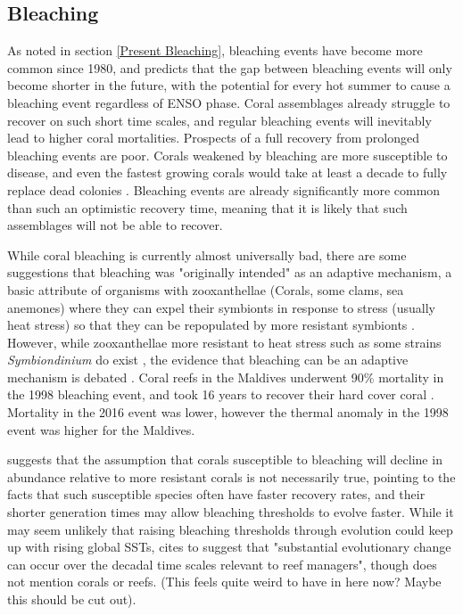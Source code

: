 \documentclass[11pt,a4paper]{article}
\begin{document}
\subsection{Bleaching}

As noted in section \ref{Present Bleaching}, bleaching events have become more common since 1980, and \cite{Hughes2018a} predicts that the gap between bleaching events will only become shorter in the future, with the potential for every hot summer to cause a bleaching event regardless of ENSO phase.
 Coral assemblages already struggle to recover on such short time scales, and regular bleaching events will inevitably lead to higher coral mortalities.
 Prospects of a full recovery from prolonged bleaching events are poor.
 Corals weakened by bleaching are more susceptible to disease, and even the fastest growing corals would take at least a decade to fully replace dead colonies \citep{Hughes2018b}.%
 Bleaching events are already significantly more common than such an optimistic recovery time, meaning that it is likely that such assemblages will not be able to recover.


While coral bleaching is currently almost universally bad, there are some suggestions that bleaching was "originally intended" as an adaptive mechanism, a basic attribute of organisms with zooxanthellae (Corals, some clams, sea anemones) where they can expel their symbionts in response to  stress (usually heat stress) so that they can be repopulated by more resistant symbionts \citep{Buddemeier1993}.
 However, while zooxanthellae more resistant to heat stress such as some strains \textit{Symbiondinium} do exist \citep{Sotka2005}, the evidence that bleaching can be an adaptive mechanism \citep{Baker2001} is debated \citep{Coles2003}.
 Coral reefs in the Maldives underwent 90\% mortality in the 1998 bleaching event, and took 16 years to recover their hard cover coral \citep{Montefalcone2020}.
 Mortality in the 2016 event was lower, however the thermal anomaly in the 1998 event was higher for the Maldives.

\cite{Pandolfi2011} suggests that the assumption that corals susceptible to bleaching will decline in abundance relative to more resistant corals is not necessarily true, pointing to the facts that such susceptible species often have faster recovery rates, and their shorter generation times may allow bleaching thresholds to evolve faster.
 While it may seem unlikely that raising bleaching thresholds through evolution could keep up with rising global SSTs, \cite{Pandolfi2011} cites \cite{Stockwell2003} to suggest that "substantial evolutionary change can occur over the decadal time scales relevant to reef managers", though \cite{Stockwell2003} does not mention corals or reefs. (This feels quite weird to have in here now? Maybe this should be cut out).
\end{document}
